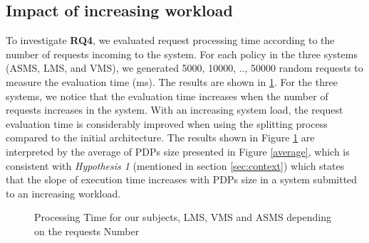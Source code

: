 \subsection{Impact of increasing workload}\label{subsec:Systemworkload}
To investigate \textbf{RQ4}, we evaluated request processing time according to the number of requests incoming to the system. 
For each policy in the three systems (ASMS, LMS, and VMS), we generated 5000, 10000, .., 50000 random requests to measure the evaluation time (ms).
The results are shown in \ref{fig:processing time xengine}. For the three systems, we notice that the evaluation time increases when 
the number of requests increases in the system. With an increasing system load, the request evaluation time is considerably
 improved when using the splitting process compared to the initial architecture. 
The results shown in Figure \ref{fig:processing time xengine} are interpreted by the average of PDPs size presented in 
Figure \ref{average}, which is consistent with \textit{Hypothesis 1} (mentioned in section \ref{sec:context}) 
which states that the slope of execution time increases with PDPs size in a system submitted to an increasing workload.
\begin{figure}
  \centering
  \caption{Processing Time for our subjects, LMS, VMS and ASMS depending on the requests Number}
  \label{fig:processing time xengine}
\end{figure}

